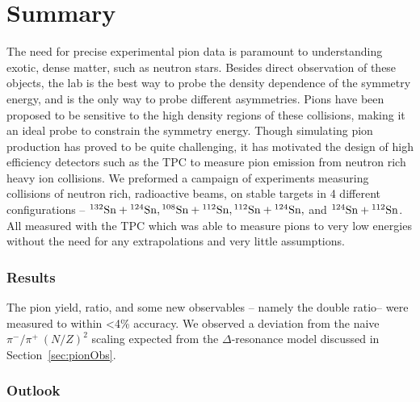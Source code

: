 \chapter{Summary}
The need for precise experimental pion data is paramount to understanding exotic, dense matter, such as neutron stars. Besides direct observation of these objects, the lab is the best way to probe the density dependence of the symmetry energy, and is the only way to probe different asymmetries. Pions have been proposed to be sensitive to the high density regions of these collisions, making it an ideal probe to constrain the symmetry energy. Though simulating pion production has proved to be quite challenging, it has motivated the design of high efficiency detectors such as the \spirit TPC to measure pion emission from neutron rich heavy ion collisions. 
We preformed a campaign of experiments measuring collisions of neutron rich, radioactive beams, on stable targets in 4 different configurations -- ${}^{132}\mathrm{Sn} + {}^{124}\mathrm{Sn}, {}^{108}\mathrm{Sn} + {}^{112}\mathrm{Sn}, {}^{112}\mathrm{Sn} + {}^{124}\mathrm{Sn},$ and ${}^{124}\mathrm{Sn} + {}^{112}\mathrm{Sn}$. All measured with the \spirit TPC which was able to measure pions to very low energies without the need for any extrapolations and very little assumptions. 

\subsection{Results}
The pion yield, ratio, and some new observables -- namely the double ratio-- were measured to within <4\% accuracy. We observed a deviation from the  naive $\pi^-/\pi^+ ~ (N/Z)^2$ scaling expected from the $\Delta$-resonance model discussed in Section~\ref{sec:pionObs}. 




\subsection{Outlook}


